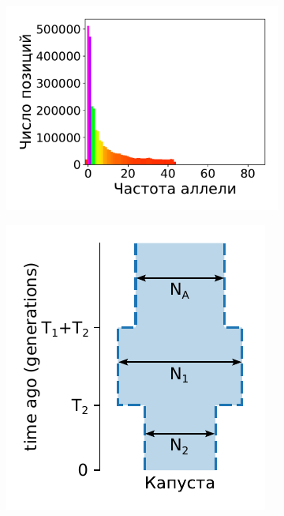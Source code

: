 \begin{figure}[ht]
    \centering
    \begin{subfigure}[b]{.44\textwidth}
    \includegraphics[width=\textwidth]{images_experiments/cabbage/1d_plot.pdf}
    \caption{}
    \label{fig:part2:experiments:cabbage:data}
    \end{subfigure}%
    \begin{subfigure}[b]{.28\textwidth}
    \includegraphics[width=\textwidth]{images_experiments/cabbage/picture_cabbage_model_1.pdf}

\end{subfigure}
\end{figure}

